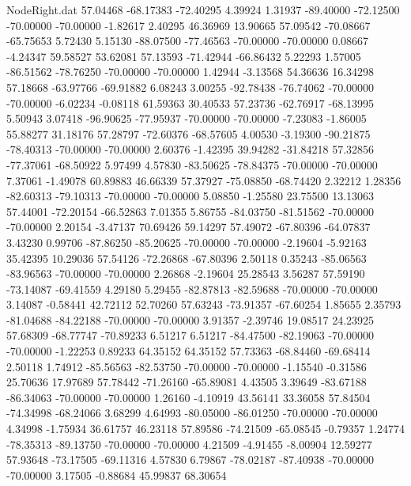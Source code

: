 \begin{filecontents}{NodeRight.dat}
  57.04468  -68.17383  -72.40295     4.39924    1.31937  -89.40000  -72.12500  -70.00000  -70.00000   -1.82617    2.40295   46.36969   13.90665
  57.09542  -70.08667  -65.75653     5.72430    5.15130  -88.07500  -77.46563  -70.00000  -70.00000    0.08667   -4.24347   59.58527   53.62081
  57.13593  -71.42944  -66.86432     5.22293    1.57005  -86.51562  -78.76250  -70.00000  -70.00000    1.42944   -3.13568   54.36636   16.34298
  57.18668  -63.97766  -69.91882     6.08243    3.00255  -92.78438  -76.74062  -70.00000  -70.00000   -6.02234   -0.08118   61.59363   30.40533
  57.23736  -62.76917  -68.13995     5.50943    3.07418  -96.90625  -77.95937  -70.00000  -70.00000   -7.23083   -1.86005   55.88277   31.18176
  57.28797  -72.60376  -68.57605     4.00530   -3.19300  -90.21875  -78.40313  -70.00000  -70.00000    2.60376   -1.42395   39.94282  -31.84218
  57.32856  -77.37061  -68.50922     5.97499    4.57830  -83.50625  -78.84375  -70.00000  -70.00000    7.37061   -1.49078   60.89883   46.66339
  57.37927  -75.08850  -68.74420     2.32212    1.28356  -82.60313  -79.10313  -70.00000  -70.00000    5.08850   -1.25580   23.75500   13.13063
  57.44001  -72.20154  -66.52863     7.01355    5.86755  -84.03750  -81.51562  -70.00000  -70.00000    2.20154   -3.47137   70.69426   59.14297
  57.49072  -67.80396  -64.07837     3.43230    0.99706  -87.86250  -85.20625  -70.00000  -70.00000   -2.19604   -5.92163   35.42395   10.29036
  57.54126  -72.26868  -67.80396     2.50118    0.35243  -85.06563  -83.96563  -70.00000  -70.00000    2.26868   -2.19604   25.28543    3.56287
  57.59190  -73.14087  -69.41559     4.29180    5.29455  -82.87813  -82.59688  -70.00000  -70.00000    3.14087   -0.58441   42.72112   52.70260
  57.63243  -73.91357  -67.60254     1.85655    2.35793  -81.04688  -84.22188  -70.00000  -70.00000    3.91357   -2.39746   19.08517   24.23925
  57.68309  -68.77747  -70.89233     6.51217    6.51217  -84.47500  -82.19063  -70.00000  -70.00000   -1.22253    0.89233   64.35152   64.35152
  57.73363  -68.84460  -69.68414     2.50118    1.74912  -85.56563  -82.53750  -70.00000  -70.00000   -1.15540   -0.31586   25.70636   17.97689
  57.78442  -71.26160  -65.89081     4.43505    3.39649  -83.67188  -86.34063  -70.00000  -70.00000    1.26160   -4.10919   43.56141   33.36058
  57.84504  -74.34998  -68.24066     3.68299    4.64993  -80.05000  -86.01250  -70.00000  -70.00000    4.34998   -1.75934   36.61757   46.23118
  57.89586  -74.21509  -65.08545    -0.79357    1.24774  -78.35313  -89.13750  -70.00000  -70.00000    4.21509   -4.91455   -8.00904   12.59277
  57.93648  -73.17505  -69.11316     4.57830    6.79867  -78.02187  -87.40938  -70.00000  -70.00000    3.17505   -0.88684   45.99837   68.30654

\end{filecontents}
